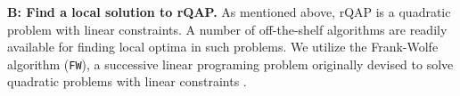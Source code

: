 \documentclass[10pt,journal,cspaper,compsoc]{IEEEtran}
\begin{document}
\textbf{B: Find a local solution to rQAP.} As mentioned above, rQAP is a quadratic problem with linear constraints.  A number of off-the-shelf algorithms are readily available for finding local optima in such problems.  We utilize the Frank-Wolfe algorithm (\texttt{FW}), a successive linear programing problem originally devised to solve quadratic problems with linear constraints \cite{Frank1956, Bradley1977}.
\end{document}

